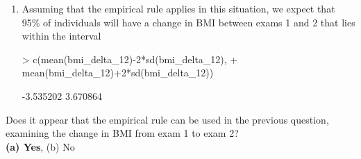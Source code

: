 \documentclass{article}
\begin{document}
\begin{enumerate}
\item Assuming that the empirical rule applies in this situation, we expect that 95\% of individuals will have a change in BMI between exams 1 and 2 that lies within the interval 
\begin{Schunk}
\begin{Sinput}
> c(mean(bmi_delta_12)-2*sd(bmi_delta_12), 
+   mean(bmi_delta_12)+2*sd(bmi_delta_12))
\end{Sinput}
\begin{Soutput}
[1] -3.535202  3.670864
\end{Soutput}
\end{Schunk}
\end{enumerate}

\item Does it appear that the empirical rule can be used in the previous question, examining the change in BMI from exam 1 to exam 2?\\
\textbf{(a) Yes}, (b) No
\end{document}
